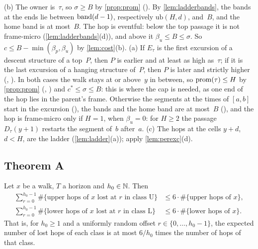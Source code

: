 \begin{outline}
(b) The owner is~$\tau$, so $\sigma\ge B$ by \cref{prop:prom} (). By \cref{lem:ladderbands}, the bands at the
ends lie between $\operatorname{band}(d-1)$, respectively $\mathrm{ub}(H,d)$, and~$B$, and the home band is at most~$B$. The hop is eventful:
below the top passage it is not frame-micro (\cref{lem:ladderbands}(d)), and above it $\beta_u\le B\le\sigma$. So
$c\le B-\min(\beta_p,\beta_u)$ by \cref{lem:cost}(b). (a) If $E_\tau$ is the first excursion of a descent structure of a top~$P$,
then $P$ is earlier and at least as high as~$\tau$; if it is the last excursion of a hanging structure of~$P$, then $P$ is later
and strictly higher (, ). In both cases the walk stays at or above~$y$ in between, so
$\operatorname{prom}(\tau)\le H$ by \cref{prop:prom} (, ) and $c^*\le\sigma\le B$: this is where
the cap is needed, as one end of the hop lies in the parent's frame. Otherwise the segments at the times of $[a,b]$ start in the
excursion (), the bands and the home band are at most~$B$ (), and the hop is
frame-micro only if $H=1$, when $\beta_u=0$: for $H\ge2$ the passage $D_\tau(y+1)$ restarts the segment of~$b$ after~$a$. (c) The
hops at the cells $y+d$, $d<H$, are the ladder (\cref{lem:ladder}(a)); apply \cref{lem:perexc}(d).
\end{outline}

\subsection{Theorem A}\label{sec:ladders-thmA}

\begin{theorem}\label{thm:A}
Let $x$ be a walk, $T$ a horizon and $h_0\in\mathbb{N}$. Then
\begin{align*}
  \sum_{r=0}^{h_0-1}\#\{\text{upper hops of $x$ lost at $r$ in class U}\}&\le6\cdot\#\{\text{upper hops of $x$}\},\\
  \sum_{r=0}^{h_0-1}\#\{\text{lower hops of $x$ lost at $r$ in class L}\}&\le6\cdot\#\{\text{lower hops of $x$}\}.
\end{align*}
That is, for $h_0\ge1$ and a uniformly random offset $r\in\{0,\dots,h_0-1\}$, the expected number of lost hops of each class is
at most $6/h_0$ times the number of hops of that class.
\end{theorem}

